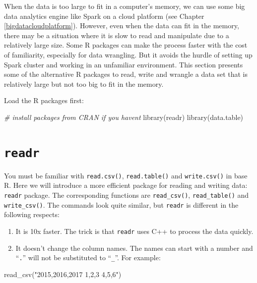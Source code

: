 \documentclass[
  12pt,
]{krantz}
\makeatletter
\newenvironment{Shaded}{\begin{snugshade}}{\end{snugshade}}
\newcommand{\CommentTok}[1]{\textcolor[rgb]{0.37,0.37,0.37}{\textit{#1}}}
\newcommand{\FunctionTok}[1]{\textcolor[rgb]{0,0,0}{#1}}
\newcommand{\NormalTok}[1]{#1}
\newcommand{\StringTok}[1]{\textcolor[rgb]{0.5,0.5,0.5}{#1}}
\newenvironment{kframe}{%
\medskip{}
\setlength{\fboxsep}{.8em}
 \def\at@end@of@kframe{}%
 \ifinner\ifhmode%
  \def\at@end@of@kframe{\end{minipage}}%
  \begin{minipage}{\columnwidth}%
 \fi\fi%
 \def\FrameCommand##1{\hskip\@totalleftmargin \hskip-\fboxsep
 \colorbox{shadecolor}{##1}\hskip-\fboxsep
     \hskip-\linewidth \hskip-\@totalleftmargin \hskip\columnwidth}%
 \MakeFramed {\advance\hsize-\width
   \@totalleftmargin\z@ \linewidth\hsize
   \@setminipage}}%
 {\par\unskip\endMakeFramed%
 \at@end@of@kframe}
\renewenvironment{Shaded}{\begin{kframe}}{\end{kframe}}
\makeatother
\begin{document}
When the data is too large to fit in a computer's memory, we can use some big data analytics engine like Spark on a cloud platform (see Chapter \ref{bigdatacloudplatform}). However, even when the data can fit in the memory, there may be a situation where it is slow to read and manipulate due to a relatively large size. Some R packages can make the process faster with the cost of familiarity, especially for data wrangling. But it avoids the hurdle of setting up Spark cluster and working in an unfamiliar environment. This section presents some of the alternative R packages to read, write and wrangle a data set that is relatively large but not too big to fit in the memory.

Load the R packages first:

\begin{Shaded}
\begin{Highlighting}[]
\CommentTok{\# install packages from CRAN if you haven\textquotesingle{}t}
\FunctionTok{library}\NormalTok{(readr)}
\FunctionTok{library}\NormalTok{(data.table)}
\end{Highlighting}
\end{Shaded}

\hypertarget{readr}{%
\section{\texorpdfstring{\texttt{readr}}{readr}}\label{readr}}

You must be familiar with \texttt{read.csv()}, \texttt{read.table()} and \texttt{write.csv()} in base R. Here we will introduce a more efficient package for reading and writing data: \texttt{readr} package. The corresponding functions are \texttt{read\_csv()}, \texttt{read\_table()} and \texttt{write\_csv()}. The commands look quite similar, but \texttt{readr} is different in the following respects:

\begin{enumerate}
\def\labelenumi{\arabic{enumi}.}
\item
  It is 10x faster. The trick is that \texttt{readr} uses C++ to process the data quickly.
\item
  It doesn't change the column names. The names can start with a number and ``\texttt{.}'' will not be substituted to ``\texttt{\_}''. For example:
\end{enumerate}

\begin{Shaded}
\begin{Highlighting}[]
\FunctionTok{read\_csv}\NormalTok{(}\StringTok{"2015,2016,2017}
\StringTok{1,2,3}
\StringTok{4,5,6"}\NormalTok{)}
\end{Highlighting}
\end{Shaded}
\end{document}
